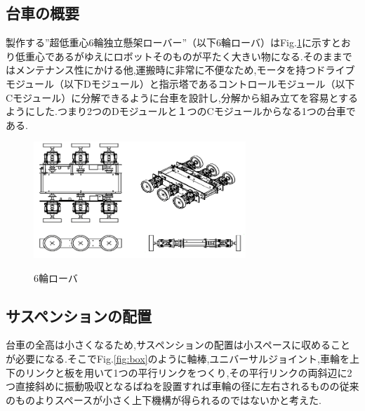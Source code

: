 \documentclass[a4paper]{jarticle}
\begin{document}
\subsection{台車の概要}

製作する”超低重心6輪独立懸架ローバー”（以下6輪ローバ）はFig.\ref{fig:rokurin}に示すとおり低重心であるがゆえにロボットそのものが平たく大きい物になる.そのままではメンテナンス性にかける他,運搬時に非常に不便なため,モータを持つドライブモジュール（以下Dモジュール）と指示塔であるコントロールモジュール（以下Cモジュール）に分解できるように台車を設計し,分解から組み立てを容易とするようにした.つまり2つのDモジュールと１つのCモジュールからなる1つの台車である.

\begin{figure}[htbt]
 \begin{center}
  \includegraphics[width=80mm]{img/fig3.png}
 　\caption{6輪ローバ}
  \label{fig:rokurin}%
 \end{center}
\end{figure}

\subsection{サスペンションの配置}

台車の全高は小さくなるため,サスペンションの配置は小スペースに収めることが必要になる.そこでFig.\ref{fig:box}のように軸棒,ユニバーサルジョイント,車輪を上下のリンクと板を用いて1つの平行リンクをつくり,その平行リンクの両斜辺に2つ直接斜めに振動吸収となるばねを設置すれば車輪の径に左右されるものの従来のものよりスペースが小さく上下機構が得られるのではないかと考えた.
\end{document}
